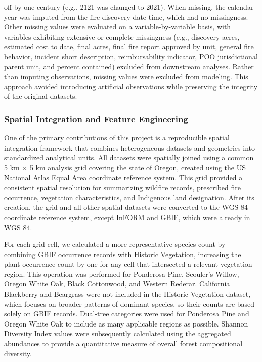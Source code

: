 \documentclass[
  letterpaper,
  DIV=11,
  numbers=noendperiod]{scrartcl}
\begin{document}
off by one century (e.g., 2121 was changed to 2021). When missing, the
calendar year was imputed from the fire discovery date-time, which had
no missingness. Other missing values were evaluated on a
variable-by-variable basis, with variables exhibiting extensive or
complete missingness (e.g., discovery acres, estimated cost to date,
final acres, final fire report approved by unit, general fire behavior,
incident short description, reimbursability indicator, POO
jurisdictional parent unit, and percent contained) excluded from
downstream analyses. Rather than imputing observations, missing values
were excluded from modeling. This approach avoided introducing
artificial observations while preserving the integrity of the original
datasets.

\subsubsection{Spatial Integration and Feature
Engineering}\label{spatial-integration-and-feature-engineering}

One of the primary contributions of this project is a reproducible
spatial integration framework that combines heterogeneous datasets and
geometries into standardized analytical units. All datasets were
spatially joined using a common 5 km × 5 km analysis grid covering the
state of Oregon, created using the US National Atlas Equal Area
coordinate reference system. This grid provided a consistent spatial
resolution for summarizing wildfire records, prescribed fire occurrence,
vegetation characteristics, and Indigenous land designation. After its
creation, the grid and all other spatial datasets were converted to the
WGS 84 coordinate reference system, except InFORM and GBIF, which were
already in WGS 84.\hspace{0pt}

For each grid cell, we calculated a more representative species count by
combining GBIF occurrence records with Historic Vegetation, increasing
the plant occurrence count by one for any cell that intersected a
relevant vegetation region. This operation was performed for Ponderosa
Pine, Scouler's Willow, Oregon White Oak, Black Cottonwood, and Western
Rederar. California Blackberry and Beargrass were not included in the
Historic Vegetation dataset, which focuses on broader patterns of
dominant species, so their counts are based solely on GBIF records.
Dual-tree categories were used for Ponderosa Pine and Oregon White Oak
to include as many applicable regions as possible. Shannon Diversity
Index values were subsequently calculated using the aggregated
abundances to provide a quantitative measure of overall forest
compositional diversity.
\end{document}
